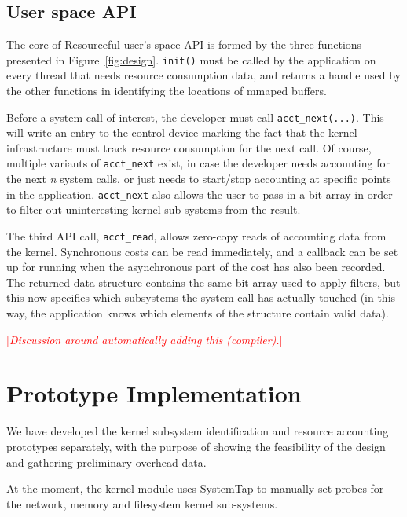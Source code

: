 \documentclass[letterpaper,twocolumn,10pt]{article}
\newcommand{\pname}{Resourceful}
\newcommand{\lnote}[1]{\textcolor{red}{[\textit{#1}]}} %
\begin{document}

\subsection{User space API}
The core of \pname{ }user's space API is formed by the three functions presented
in Figure~\ref{fig:design}. \texttt{init()} must be called by the application on
every thread that needs resource consumption data, and returns a handle used by
the other functions in identifying the locations of mmaped buffers. 

Before a system call of interest, the developer must call
\texttt{acct\_next(...)}. This will write an entry to the control device marking
the fact that the kernel infrastructure must track resource consumption for the
next call. Of course, multiple variants of \texttt{acct\_next} exist, in case
the developer needs accounting for the next \textit{n} system calls, or just
needs to start/stop accounting at specific points in the application.
\texttt{acct\_next} also allows the user to pass in a bit array in order to
filter-out uninteresting kernel sub-systems from the result.

The third API call, \texttt{acct\_read}, allows zero-copy reads of accounting
data from the kernel. Synchronous costs can be read immediately, and a callback
can be set up for running when the asynchronous part of the cost has also been
recorded. The returned data structure contains the same bit array used to apply
filters, but this now specifies which subsystems the system call has actually touched
(in this way, the application knows which elements of the structure contain valid data).

\lnote{Discussion around automatically adding this (compiler).}

\section{Prototype Implementation} 
We have developed the kernel subsystem identification and resource accounting
prototypes separately, with the purpose of showing the feasibility of the design
and gathering preliminary overhead data.

At the moment, the kernel module uses SystemTap to manually set probes for the
network, memory and filesystem kernel sub-systems.
\end{document}

